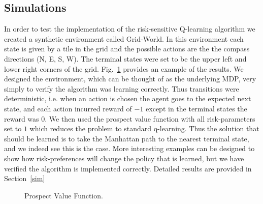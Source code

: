 \documentclass{article}
\begin{document}
\subsection{Simulations}
In order to test the implementation of the risk-sensitive Q-learning algorithm we created a synthetic environment called Grid-World. In this environment each state is given by a tile in the grid and the possible actions are the the compass directions (N, E, S, W). The terminal states were set to be the upper left and lower right corners of the grid. Fig.~\ref{fig:sim} provides an example of the results. We designed the environment, which can be thought of as the underlying MDP, very simply to verify the algorithm was learning correctly. Thus transitions were deterministic, i.e. when an action is chosen the agent goes to the expected next state, and each action incurred reward of $-1$ except in the terminal states the reward was $0$. We then used the prospect value function with all risk-parameters set to $1$ which reduces the problem to standard q-learning. Thus the solution that should be learned is to take the Manhattan path to the nearest terminal state, and we indeed see this is the case. More interesting examples can be designed to show how risk-preferences will change the policy that is learned, but we have verified the algorithm is implemented correctly. Detailed results are provided in Section~\ref{sim}
\begin{figure}[t]
    \centering
    \hfill
    \hfill
    \hfill
    \caption{Prospect Value Function.}
    \label{fig:sim}
\end{figure}
\end{document}
